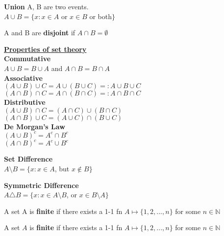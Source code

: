 \documentclass[12pt, oneside, letterpaper]{notes}
\begin{document}
\begin{mydef}
  \textbf{Union} A, B are two events. \\
  \indent $A \cup B = \{x: x \in A$ or $x \in B$ or both$\}$
\end{mydef}

\begin{mydef}
  A and B are \textbf{disjoint} if $A \cap B = \emptyset$
\end{mydef}

\noindent \underline{\textbf{Properties of set theory}}  \\
\textbf{Commutative}  \\
\indent $A \cup B = B \cup A$ and $A \cap B = B \cap A$ \\
\textbf{Associative}\\
\indent $(A \cup B) \cup C = A \cup (B \cup C) =: A \cup B \cup C$ \\
\indent $(A \cap B) \cap C = A \cap (B \cap C) =: A \cap B \cap C$ \\
\textbf{Distributive}\\
\indent $(A \cup B) \cap C = (A \cap C) \cup (B \cap C)$ \\
\indent $(A \cap B) \cup C = (A \cup C) \cap (B \cup C)$ \\
\textbf{De Morgan's Law}\\
\indent $(A \cup B)^c = A^c \cap B^c$ \\
\indent $(A \cap B)^c = A^c \cup B^c$ 

\begin{mydef}
  \textbf{Set Difference}\\
  \indent $A \setminus B = \{x: x \in A$, but $x \notin B \}$
\end{mydef}

\begin{mydef}
  \textbf{Symmetric Difference}\\
  \indent $A \triangle B = \{x: x \in A \setminus B$, or 
  $x \in B \setminus A \}$
\end{mydef}

\begin{mydef}
  A set A is \textbf{finite} if there exists a 1-1 fn $A \mapsto 
  \{ 1, 2, ..., n \}$ for some $n \in \mathbb{N}$
\end{mydef}

%
%

\begin{mydef}
  A set $A$ is \textbf{finite} if there exists a 1-1 fn $A \mapsto 
  \{ 1, 2, ..., n \}$ for some $n \in \mathbb{N}$
\end{mydef}
\end{document}
